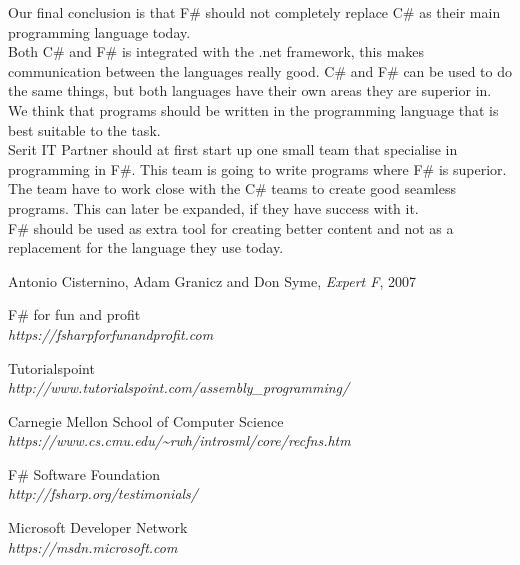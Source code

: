 \documentclass[12pt, a4paper]{article}
\begin{document}
Our final conclusion is that F\# should not completely replace C\# as their main programming language today.\\  

Both C\# and F\# is integrated with the .net framework, this makes communication between the languages really good. C\# and F\# can be used to do the same things, but both languages have their own areas they are superior in. We think that programs should be written in the programming language that is best suitable to the task.\\

Serit IT Partner should at first start up one small team that specialise in programming in F\#. This team is going to write programs where F\# is superior. The team have to work close with the C\# teams to create good seamless programs. This can later be expanded, if they have success with it.\\

F\# should be used as extra tool for creating better content and not as a replacement for the language they use today. 

\newpage


\begin{thebibliography}{9}

Antonio Cisternino, Adam Granicz and Don Syme,
\textit{Expert F}, 
2007

F\# for fun and profit\\
\emph{https://fsharpforfunandprofit.com}

Tutorialspoint\\
\emph{http://www.tutorialspoint.com/assembly\_programming/}

Carnegie Mellon School of Computer Science\\
\emph{https://www.cs.cmu.edu/\textasciitilde rwh/introsml/core/recfns.htm}

F\# Software Foundation\\
\emph{http://fsharp.org/testimonials/}

Microsoft Developer Network\\
\emph{https://msdn.microsoft.com}


 
\end{thebibliography}
\newpage
\end{document}

